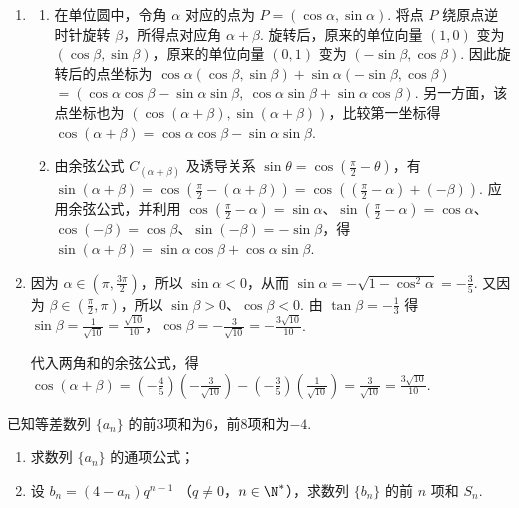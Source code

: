 \begin{solution}
\begin{enumerate}
\item
\begin{enumerate}
\item 在单位圆中，令角 \(\alpha\) 对应的点为 \(P=(\cos\alpha,\sin\alpha)\). 将点 \(P\) 绕原点逆时针旋转 \(\beta\)，所得点对应角 \(\alpha+\beta\). 旋转后，原来的单位向量 \((1,0)\) 变为 \((\cos\beta,\sin\beta)\)，原来的单位向量 \((0,1)\) 变为 \((-\sin\beta,\cos\beta)\). 因此旋转后的点坐标为
\(\cos\alpha(\cos\beta,\sin\beta)+\sin\alpha(-\sin\beta,\cos\beta)\)
\(=(\cos\alpha\cos\beta-\sin\alpha\sin\beta,\ \cos\alpha\sin\beta+\sin\alpha\cos\beta)\).
另一方面，该点坐标也为 \((\cos(\alpha+\beta),\sin(\alpha+\beta))\)，比较第一坐标得 \(\cos(\alpha+\beta)=\cos\alpha\cos\beta-\sin\alpha\sin\beta\).
\item 由余弦公式 \(C_{(\alpha+\beta)}\) 及诱导关系 \(\sin\theta=\cos\left(\frac{\pi}{2}-\theta\right)\)，有 \(\sin(\alpha+\beta)=\cos\left(\frac{\pi}{2}-(\alpha+\beta)\right)=\cos\left(\left(\frac{\pi}{2}-\alpha\right)+(-\beta)\right)\). 应用余弦公式，并利用 \(\cos\left(\frac{\pi}{2}-\alpha\right)=\sin\alpha\)、\(\sin\left(\frac{\pi}{2}-\alpha\right)=\cos\alpha\)、\(\cos(-\beta)=\cos\beta\)、\(\sin(-\beta)=-\sin\beta\)，得 \(\sin(\alpha+\beta)=\sin\alpha\cos\beta+\cos\alpha\sin\beta\).
\end{enumerate}
\item 因为 \(\alpha\in(\pi,\frac{3\pi}{2})\)，所以 \(\sin\alpha<0\)，从而 \(\sin\alpha=-\sqrt{1-\cos^2\alpha}=-\frac35\). 又因为 \(\beta\in(\frac\pi2,\pi)\)，所以 \(\sin\beta>0\)、\(\cos\beta<0\). 由 \(\tan\beta=-\frac{1}{3}\) 得
\(\sin\beta=\frac1{\sqrt{10}}=\frac{\sqrt{10}}{10}\)，\(\cos\beta=-\frac3{\sqrt{10}}=-\frac{3\sqrt{10}}{10}\).

代入两角和的余弦公式，得
\(\cos(\alpha+\beta)=\left(-\frac45\right)\left(-\frac3{\sqrt{10}}\right)-\left(-\frac35\right)\left(\frac1{\sqrt{10}}\right)=\frac3{\sqrt{10}}=\frac{3\sqrt{10}}{10}\).
\end{enumerate}
\end{solution}

\begin{problem}
已知等差数列 \(\{a_n\}\) 的前3项和为6，前8项和为\(-4\).

\begin{enumerate}
\item 求数列 \( \{a_n\} \) 的通项公式；
\item 设 \( b_{n} = (4 - a_{n})q^{n - 1} \) （\(q \neq 0\)，\(n \in \N^*\)），求数列 \( \{b_{n}\} \) 的前 \( n \) 项和 \( S_{n} \).
\end{enumerate}
\end{problem}

